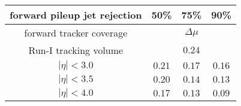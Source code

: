 \begin{tabular}{c|c|c|c}
      forward pileup jet rejection & \multicolumn{1}{c}{50\%} & \multicolumn{1}{c}{75\%}   & \multicolumn{1}{c}{90\%} \\
      \hline \hline
      forward tracker coverage     & \multicolumn{3}{c}{$\Delta\mu$} \\
      \hline
      Run-I tracking volume        & \multicolumn{1}{c}{}     & \multicolumn{1}{c}{$0.24$} & \multicolumn{1}{c}{} \\
      $|\eta| < 3.0$               & $0.21$                   & $0.17$                     & $0.16$ \\
      $|\eta| < 3.5$               & $0.20$                   & $0.14$                     & $0.13$ \\
      $|\eta| < 4.0$               & $0.17$                   & $0.13$                     & $0.09$ \\
\end{tabular}
